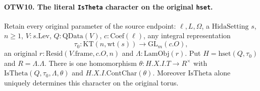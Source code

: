\paragraph{OTW10. The literal \texttt{IsTheta} character on the original \texttt{hset}.}
\label{claim:OTW10}
Retain every original parameter of the source endpoint:
$\ell,L,\Omega$, a $\mathrm{HidaSetting}$ $s$, $n\geq1$,
$V:s.\mathrm{Lev}$, $Q:\mathrm{QData}(V)$, $c:\mathrm{Coef}(\ell)$,
any integral representation
\[
 \tau_0:\mathrm{KT}(n,\mathrm{wt}(s))
                      \longrightarrow\mathrm{GL}_m(c.O),
 \tag{OTW.24}
\]
an original $r:\mathrm{Resid}(V.\mathrm{frame},c.O,n)$ and
$\Lambda:\mathrm{LamObj}(r)$.  Put $H=\mathrm{hset}(Q,\tau_0)$
and $R=\Lambda.\Lambda$.  There is one homomorphism
$\theta:H.X.I.T\to R^\times$ with
$\mathrm{IsTheta}(Q,\tau_0,\Lambda,\theta)$ and
$H.X.I.\mathrm{ContChar}(\theta)$.  Moreover $\mathrm{IsTheta}$
alone uniquely determines this character on the original torus.
